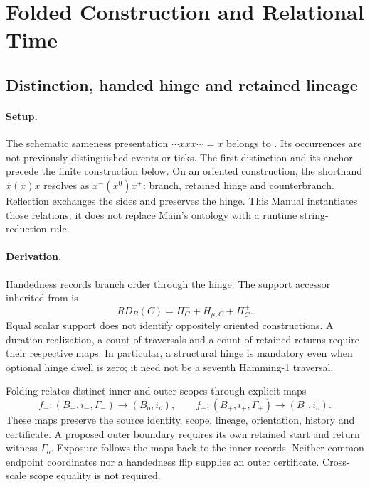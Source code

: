 \section{Folded Construction and Relational Time}\label{manual2:folding-time}


\subsection{Distinction, handed hinge and retained lineage}
\paragraph{Setup.}
The schematic sameness presentation \(\cdots xxx\cdots=x\) belongs to . Its occurrences are not previously distinguished events or ticks. The first distinction and its anchor precede the finite construction below. On an oriented construction, the shorthand \(x(x)x\) resolves as \(x^-(x^0)x^+\): branch, retained hinge and counterbranch. Reflection exchanges the sides and preserves the hinge. This Manual instantiates those relations; it does not replace Main's ontology with a runtime string-reduction rule.

\paragraph{Derivation.}
Handedness records branch order through the hinge. The support accessor inherited from  is
\[
RD_B(C)=\Pi_C^-+H_{\mu,C}+\Pi_C^+.
\]
Equal scalar support does not identify oppositely oriented constructions. A duration realization, a count of traversals and a count of retained returns require their respective maps. In particular, a structural hinge is mandatory even when optional hinge dwell is zero; it need not be a seventh Hamming-1 traversal.

Folding relates distinct inner and outer scopes through explicit maps
\[
f_-:(B_-,i_-,\Gamma_-)\longrightarrow(B_o,i_o),\qquad
f_+:(B_+,i_+,\Gamma_+)\longrightarrow(B_o,i_o).
\]
These maps preserve the source identity, scope, lineage, orientation, history and certificate. A proposed outer boundary requires its own retained start and return witness \(\Gamma_o\). Exposure follows the maps back to the inner records. Neither common endpoint coordinates nor a handedness flip supplies an outer certificate. Cross-scale scope equality is not required.

